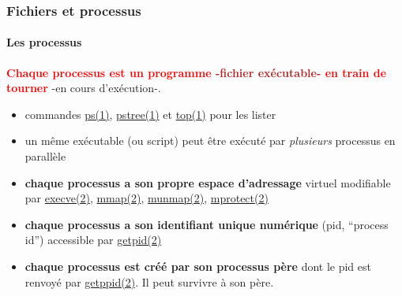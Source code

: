 \documentclass[xcolor=svgnames,final,smaller,a4]{beamer}
\begin{document}
\begin{frame}
  \frametitle{Fichiers et processus}
  \framesubtitle{Les processus}

   \textbf{\textcolor{red}{Chaque processus est un programme \textcolor{FireBrick}{-fichier exécutable-} en train de tourner}} -en cours
  d'exécution-.  {}
  
  \begin{itemize}

  \item commandes
    \href{https://man7.org/linux/man-pages/man1/ps.1.html}{ps(1)},
    \href{https://man7.org/linux/man-pages/man1/pstree.1.html}{pstree(1)}
    et \href{https://man7.org/linux/man-pages/man1/top.1.html}{top(1)}
    pour les lister {}
    
  \item un même exécutable (ou script) peut être exécuté par \emph{plusieurs}
    processus en parallèle {}

  \item \textbf{chaque processus a son propre espace d'adressage} virtuel modifiable par
  \href{https://man7.org/linux/man-pages/man2/execve.2.html}{execve(2)},
  \href{https://man7.org/linux/man-pages/man2/mmap.2.html}{mmap(2)},
  \href{https://man7.org/linux/man-pages/man2/munmap.2.html}{munmap(2)},
  \href{https://man7.org/linux/man-pages/man2/mprotect.2.html}{mprotect(2)}

    \item \textbf{chaque processus a son identifiant unique numérique} (pid, ``process id'')
 accessible par \href{https://man7.org/linux/man-pages/man2/getpid.2.html}{getpid(2)}
    
    \item \textbf{chaque processus est créé par son processus père} {} dont le pid est renvoyé par
  \href{https://man7.org/linux/man-pages/man2/getppid.2.html}{getppid(2)}. Il peut survivre à son père.
    
  \end{itemize}

\end{frame}
\end{document}
